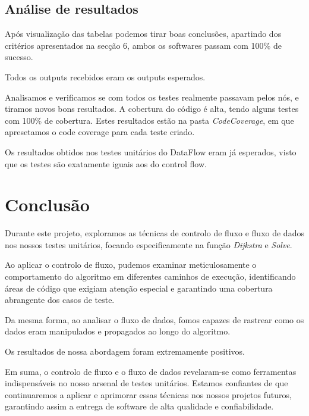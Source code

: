 \documentclass{article}
\begin{document}
\subsection{Análise de resultados}
Após visualização das tabelas podemos tirar boas conclusões, apartindo dos critérios apresentados na secção 6, ambos os softwares passam com 100\% de sucesso.

Todos os outputs recebidos eram os outputs esperados.

Analisamos e verificamos se com todos os testes realmente passavam pelos nós, e tiramos novos bons resultados. A cobertura do código é alta, tendo alguns testes com 100\% de cobertura. Estes resultados estão na pasta \textit{CodeCoverage}, em que apresetamos o code coverage para cada teste criado.

Os resultados obtidos nos testes unitários do DataFlow eram já esperados, visto que os testes são exatamente iguais aos do control flow.

\section{Conclusão}
\quad Durante este projeto, exploramos as técnicas de controlo de fluxo e fluxo de dados nos nossos testes unitários, focando especificamente na função \textit{Dijkstra} e \textit{Solve}. 

Ao aplicar o controlo de fluxo, pudemos examinar meticulosamente o comportamento do algoritmo em diferentes caminhos de execução, identificando áreas de código que exigiam atenção especial e garantindo uma cobertura abrangente dos casos de teste.

Da mesma forma, ao analisar o fluxo de dados, fomos capazes de rastrear como os dados eram manipulados e propagados ao longo do algoritmo.

Os resultados de nossa abordagem foram extremamente positivos.

Em suma, o controlo de fluxo e o fluxo de dados revelaram-se como ferramentas indispensáveis no nosso arsenal de testes unitários. Estamos confiantes de que continuaremos a aplicar e aprimorar essas técnicas nos nossos projetos futuros, garantindo assim a entrega de software de alta qualidade e confiabilidade.
\end{document}
